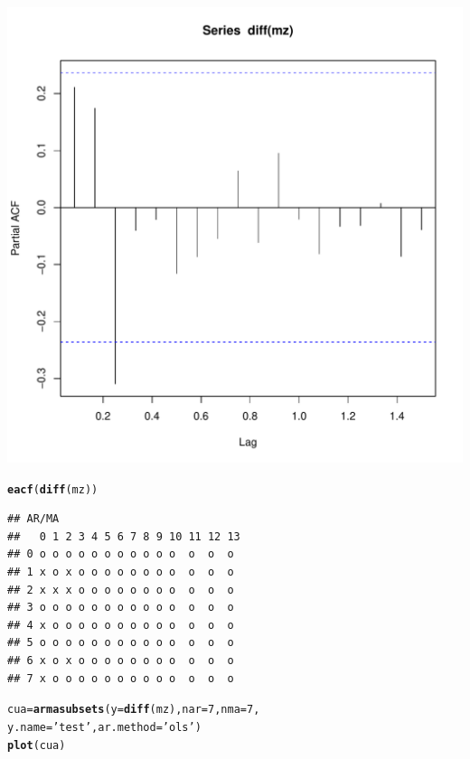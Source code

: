 \documentclass{article}\usepackage[]{graphicx}\usepackage[]{color}
\makeatletter
\def\maxwidth{ %
  \ifdim\Gin@nat@width>\linewidth
    \linewidth
  \else
    \Gin@nat@width
  \fi
}
\newcommand{\hlnum}[1]{\textcolor[rgb]{0.686,0.059,0.569}{#1}}%
\newcommand{\hlstr}[1]{\textcolor[rgb]{0.192,0.494,0.8}{#1}}%
\newcommand{\hlstd}[1]{\textcolor[rgb]{0.345,0.345,0.345}{#1}}%
\newcommand{\hlkwb}[1]{\textcolor[rgb]{0.69,0.353,0.396}{#1}}%
\newcommand{\hlkwc}[1]{\textcolor[rgb]{0.333,0.667,0.333}{#1}}%
\newcommand{\hlkwd}[1]{\textcolor[rgb]{0.737,0.353,0.396}{\textbf{#1}}}%
\newenvironment{kframe}{%
 \def\at@end@of@kframe{}%
 \ifinner\ifhmode%
  \def\at@end@of@kframe{\end{minipage}}%
  \begin{minipage}{\columnwidth}%
 \fi\fi%
 \def\FrameCommand##1{\hskip\@totalleftmargin \hskip-\fboxsep
 \colorbox{shadecolor}{##1}\hskip-\fboxsep
     \hskip-\linewidth \hskip-\@totalleftmargin \hskip\columnwidth}%
 \MakeFramed {\advance\hsize-\width
   \@totalleftmargin\z@ \linewidth\hsize
   \@setminipage}}%
 {\par\unskip\endMakeFramed%
 \at@end@of@kframe}
\newenvironment{knitrout}{}{} %
\makeatother
\begin{document}
\begin{knitrout}
\includegraphics[width=\maxwidth]{figure/unnamed-chunk-3-2} 
\begin{kframe}\begin{alltt}
\hlkwd{eacf}\hlstd{(}\hlkwd{diff}\hlstd{(mz))}
\end{alltt}
\begin{verbatim}
## AR/MA
##   0 1 2 3 4 5 6 7 8 9 10 11 12 13
## 0 o o o o o o o o o o o  o  o  o 
## 1 x o x o o o o o o o o  o  o  o 
## 2 x x x o o o o o o o o  o  o  o 
## 3 o o o o o o o o o o o  o  o  o 
## 4 x o o o o o o o o o o  o  o  o 
## 5 o o o o o o o o o o o  o  o  o 
## 6 x o x o o o o o o o o  o  o  o 
## 7 x o o o o o o o o o o  o  o  o
\end{verbatim}
\begin{alltt}
\hlstd{cua}\hlkwb{=}\hlkwd{armasubsets}\hlstd{(}\hlkwc{y}\hlstd{=}\hlkwd{diff}\hlstd{(mz),}\hlkwc{nar}\hlstd{=}\hlnum{7}\hlstd{,}\hlkwc{nma}\hlstd{=}\hlnum{7}\hlstd{,}
                \hlkwc{y.name}\hlstd{=}\hlstr{'test'}\hlstd{,} \hlkwc{ar.method}\hlstd{=}\hlstr{'ols'}\hlstd{)}
\hlkwd{plot}\hlstd{(cua)}
\end{alltt}
\end{kframe}

\end{knitrout}
\end{document}
